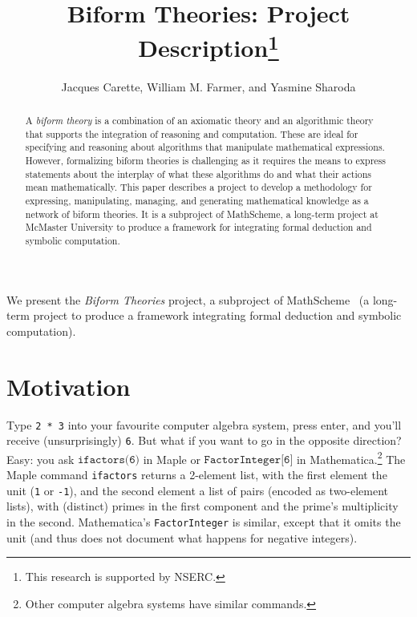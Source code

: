 \documentclass[fleqn]{llncs}
\title{Biform Theories: Project Description\thanks{This research is supported by NSERC.}}
\author{Jacques Carette, William M. Farmer, and Yasmine Sharoda}
\institute{%
Computing and Software, McMaster University, Canada\\
\url{http://www.cas.mcmaster.ca/~carette}\\
\url{http://imps.mcmaster.ca/wmfarmer}\\[1.5ex]
\today
}
\begin{document}
\maketitle

\begin{abstract}
A \emph{biform theory} is a combination of an axiomatic theory and an
algorithmic theory that supports the integration of reasoning and
computation.  These are ideal for specifying and reasoning about
algorithms that manipulate mathematical expressions.  However,
formalizing biform theories is challenging as it requires the means to
express statements about the interplay of what these algorithms do and
what their actions mean mathematically.  This paper describes a
project to develop a methodology for expressing, manipulating,
managing, and generating mathematical knowledge as a network of biform
theories.  It is a subproject of MathScheme, a long-term project at
McMaster University to produce a framework for integrating formal
deduction and symbolic computation.
\end{abstract}

\iffalse 

\textbf{Keywords:} Axiomatic mathematics, algorithmic mathematics, biform
theories, symbolic computation, reasoning about syntax, meaning
formulas, theory graphs.

\fi

\noindent
We present the \emph{Biform Theories} project, a
subproject of MathScheme~\cite{CaretteEtAl11} (a long-term project
to produce a framework integrating formal
deduction and symbolic computation).

\section{Motivation}\label{sec:problem}

Type \texttt{2 * 3} into your favourite computer algebra system, press
enter, and you'll receive (unsurprisingly) \texttt{6}. But what if you
want to go in the opposite direction?  Easy: you ask
$\texttt{ifactors(6)}$ in Maple or $\texttt{FactorInteger[6]}$ in
Mathematica.\footnote{Other computer algebra systems have similar
  commands.}  The Maple command \texttt{ifactors} returns a 2-element
list, with the first element the unit (\texttt{1} or \texttt{-1}), and
the second element a list of pairs (encoded as two-element lists),
with (distinct) primes in the first component and the prime's
multiplicity in the second. Mathematica's \texttt{FactorInteger} is
similar, except that it omits the unit (and thus does not document
what happens for negative integers).  
\end{document}
